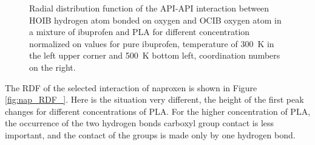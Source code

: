 \begin{figure}[htb!]
	\centering
	\caption{Radial distribution function of the API-API interaction between HOIB hydrogen atom bonded on oxygen and OCIB oxygen atom in a mixture of ibuprofen and PLA for different concentration normalized on values for pure ibuprofen, temperature of 300~K in the left upper corner and 500~K bottom left, coordination numbers on the right.}
	\label{fig:ibu_s_RDF_}
\end{figure}

The RDF of the selected interaction of naproxen is shown in Figure \ref{fig:nap_RDF_}. Here is the situation very different, the height of the first peak changes for different concentrations of PLA. For the higher concentration of PLA, the occurrence of the two hydrogen bonds carboxyl group contact is less important, and the contact of the groups is made only by one hydrogen bond.

